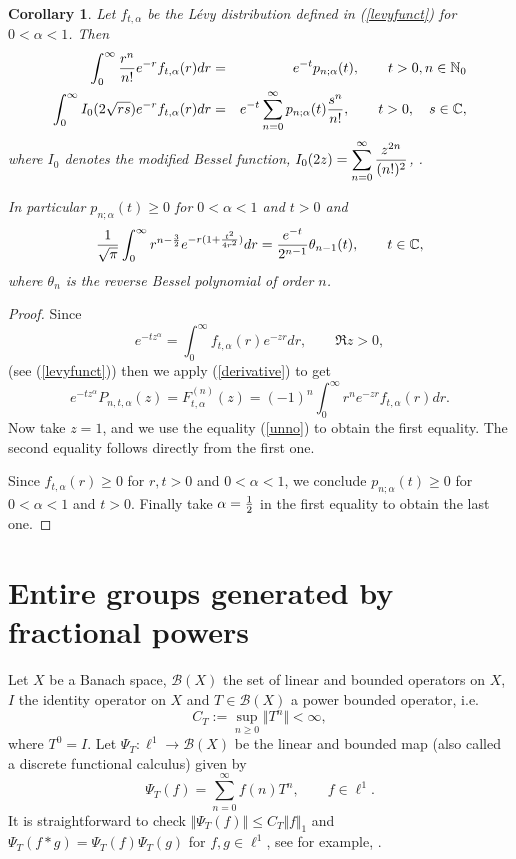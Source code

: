\documentclass[a4paper,12pt]{amsart}
\def\NN{\mathbb N}
\def\CC{\mathbb C}
\def\CC{\mathbb C}
\newtheorem{corollary}[thm]{Corollary}
\theoremstyle{definition}
\theoremstyle{remark}
\begin{document}
\begin{corollary} \label{levy} Let $f_{t,\alpha}$ be the  L\'{e}vy distribution defined in (\ref{levyfunct}) for $0<\alpha<1$. Then
\begin{eqnarray*}
   \int_0^\infty {r^n\over n!}e^{-r}f_{t,\alpha}(r)dr&=& e^{-t}p_{n;\alpha}(t), \qquad t>0, n\in \NN_0 \\
    \int_0^\infty I_0(2\sqrt{rs})e^{-r}f_{t,\alpha}(r)dr&=& e^{-t}\sum_{n=0}^\infty p_{n;\alpha}(t){s^n\over n!}, \qquad t>0,  \quad s\in \CC,
\end{eqnarray*}
where  $I_0$ denotes the modified Bessel function,  $\displaystyle{I_0(2z)=\sum_{n=0}^\infty {z^{2n}\over (n!)^2}}$, \cite[Chapter III]{MOS}.

In particular $p_{n;\alpha}(t)\ge 0$ for $0<\alpha<1$ and $t>0$ and
  $$
{1\over \sqrt{\pi}}\int_0^\infty {r^{n-{3\over 2}}}e^{-r(1+\frac{t^2}{4r^2})}dr=
\frac{e^{-t}}{2^{n-1} }\theta_{n-1}(t),\qquad t\in \CC,
$$
where  $\theta_{n}$ is the reverse Bessel polynomial of order $n$.
\end{corollary}

\begin{proof} Since
$$
e^{-tz^\alpha}=\int_0^\infty f_{t,\alpha}(r)e^{-zr}dr, \qquad \Re z>0,
$$
(see (\ref{levyfunct})) then we apply  (\ref{derivative}) to get
$$
e^{-tz^\alpha}P_{n,t,\alpha}(z)=F^{(n)}_{t,\alpha}(z)={(-1)^n}\int_0^\infty r^n e^{-zr}f_{t,\alpha}(r)dr.
$$
Now take $z=1$, and we use the equality (\ref{unno}) to obtain the first equality. The second equality follows directly from the first one.



Since $f_{t,\alpha}(r)\ge 0$ for $r,t>0$ and $0<\alpha<1$, we conclude $p_{n;\alpha}(t)\ge 0$ for $0<\alpha<1$ and $t>0$. Finally take $\alpha={1\over 2}$ in the first equality to obtain the last one.
\end{proof}
\section{Entire groups generated by fractional powers}\label{coboundaries}


Let $X$ be a Banach space, ${\mathcal B}(X)$ the set of linear and bounded operators on $X$, $I$  the identity operator on $X$ and $T\in {\mathcal B}(X)$  a power bounded operator, i.e.
 \begin{equation}\label{pbb}C_T:=\sup_{n\ge 0}{\Vert T^n\Vert}<\infty,
 \end{equation}
where $T^0=I.$  Let $\Psi_T: \ell^1\to {\mathcal B}(X)$  be the linear and bounded map (also called a discrete functional calculus) given by
$$
\Psi_T(f)= \sum_{n=0}^\infty f(n)T^n, \qquad f\in \ell^1.
$$
It is straightforward to check $\Vert\Psi_T(f)\Vert\le C_T\Vert f\Vert_1$ and $\Psi_T(f\ast g)=\Psi_T(f)\Psi_T(g)$ for $f, g\in \ell^1$, see for example, \cite[Section 2]{Dun}.
\end{document}
